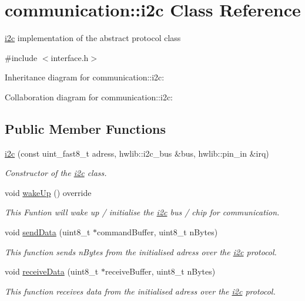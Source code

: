 \hypertarget{classcommunication_1_1i2c}{}\section{communication\+:\+:i2c Class Reference}
\label{classcommunication_1_1i2c}


\hyperlink{classcommunication_1_1i2c}{i2c} implementation of the abstract protocol class  




{\ttfamily \#include $<$interface.\+h$>$}



Inheritance diagram for communication\+:\+:i2c\+:


Collaboration diagram for communication\+:\+:i2c\+:
\subsection*{Public Member Functions}
\begin{DoxyCompactItemize}
\item 
\hyperlink{classcommunication_1_1i2c_a87bea8199d070f323db519bc061b2944}{i2c} (const uint\+\_\+fast8\+\_\+t adress, hwlib\+::i2c\+\_\+bus \&bus, hwlib\+::pin\+\_\+in \&irq)
\begin{DoxyCompactList}\small\item\em Constructor of the \hyperlink{classcommunication_1_1i2c}{i2c} class. \end{DoxyCompactList}\item 
void \hyperlink{classcommunication_1_1i2c_a342b43822a50e1837ac7c677083c7f39}{wake\+Up} () override
\begin{DoxyCompactList}\small\item\em This Funtion will wake up / initialise the \hyperlink{classcommunication_1_1i2c}{i2c} bus / chip for communication. \end{DoxyCompactList}\item 
void \hyperlink{classcommunication_1_1i2c_ad529784d80abf5e8bd493f578503e8e8}{send\+Data} (uint8\+\_\+t $\ast$command\+Buffer, uint8\+\_\+t n\+Bytes)
\begin{DoxyCompactList}\small\item\em This function sends n\+Bytes from the initialised adress over the \hyperlink{classcommunication_1_1i2c}{i2c} protocol. \end{DoxyCompactList}\item 
void \hyperlink{classcommunication_1_1i2c_a112282cf4a6500581c8e252ff2348fea}{receive\+Data} (uint8\+\_\+t $\ast$receive\+Buffer, uint8\+\_\+t n\+Bytes)
\begin{DoxyCompactList}\small\item\em This function receives data from the initialised adress over the \hyperlink{classcommunication_1_1i2c}{i2c} protocol. \end{DoxyCompactList}\end{DoxyCompactItemize}
